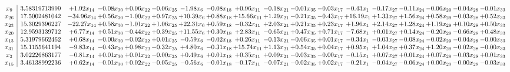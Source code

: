 \documentclass[9pt]{article}
\begin{document}
 \[\begin{array}{c| c c@{\hskip 2pt} c@{\hskip 2pt} c@{\hskip 2pt} c@{\hskip 2pt} c@{\hskip 2pt} c@{\hskip 2pt} c@{\hskip 2pt} c@{\hskip 2pt} c@{\hskip 2pt} c@{\hskip 2pt} c@{\hskip 2pt} c@{\hskip 2pt} c@{\hskip 2pt} c@{\hskip 2pt} c@{\hskip 2pt} c@{\hskip 2pt} }
 x_{9}   &  3.58319713999 & +  1.92 x_{14} & -0.08 x_{30} & +  0.06 x_{22} & -0.06 x_{25} & -1.98 x_{6} & -0.08 x_{18} & +  0.96 x_{11} & -0.18 x_{21} & -0.01 x_{35} & -0.03 x_{17} & -0.43 x_{1} & -0.17 x_{27} & -0.11 x_{24} & -0.06 x_{29} & -0.04 x_{28} & -0.01 x_{33}\\
 x_{26}   &  17.5002481042 & -34.96 x_{14} & +  0.56 x_{30} & -1.00 x_{22} & +  0.97 x_{25} & + 10.39 x_{6} & +  0.88 x_{18} & + 15.66 x_{11} & +  1.29 x_{21} & -0.21 x_{35} & -0.43 x_{17} & + 16.19 x_{1} & +  1.33 x_{27} & +  1.56 x_{24} & +  0.58 x_{29} & -0.03 x_{28} & +  0.52 x_{33}\\
 x_{23}   &  15.3029396227 & -22.27 x_{14} & +  0.58 x_{30} & -1.01 x_{22} & +  1.06 x_{25} & + 22.31 x_{6} & +  0.59 x_{18} & -0.32 x_{11} & +  2.03 x_{21} & +  0.21 x_{35} & +  0.23 x_{17} & +  1.96 x_{1} & +  2.14 x_{27} & +  1.28 x_{24} & +  1.19 x_{29} & +  0.10 x_{28} & +  0.50 x_{33}\\
 x_{20}   &  12.9593139712 & +  6.77 x_{14} & +  0.51 x_{30} & -0.44 x_{22} & +  0.39 x_{25} & + 11.55 x_{6} & +  0.30 x_{18} & +  2.83 x_{11} & -0.65 x_{21} & +  0.47 x_{35} & +  0.71 x_{17} & -7.68 x_{1} & +  0.01 x_{27} & +  0.14 x_{24} & -0.20 x_{29} & -0.66 x_{28} & +  0.48 x_{33}\\
 x_{13}   &  5.31979662462 & +  0.68 x_{14} & -0.00 x_{30} & -0.02 x_{22} & +  0.01 x_{25} & -0.59 x_{6} & -0.02 x_{18} & +  0.26 x_{11} & -0.13 x_{21} & -0.06 x_{35} & +  0.01 x_{17} & -0.34 x_{1} & -0.03 x_{27} & -0.08 x_{24} & -0.02 x_{29} & -0.04 x_{28} & -0.00 x_{33}\\
 x_{31}   &  15.1155641194 & -9.83 x_{14} & -0.43 x_{30} & +  0.98 x_{22} & -0.32 x_{25} & +  4.80 x_{6} & -0.31 x_{18} & + 15.74 x_{11} & +  1.13 x_{21} & +  0.54 x_{35} & +  0.04 x_{17} & +  0.95 x_{1} & +  1.04 x_{27} & +  0.37 x_{24} & +  1.20 x_{29} & -0.02 x_{28} & -0.00 x_{33}\\
 x_{2}   &  3.02226863177 & -0.81 x_{14} & +  0.01 x_{30} & +  0.01 x_{22} & -0.00 x_{25} & +  0.49 x_{6} & +  0.01 x_{18} & +  0.35 x_{11} & +  0.09 x_{21} & -0.03 x_{35} & -0.00 x_{17} & -0.15 x_{1} & +  0.07 x_{27} & +  0.01 x_{24} & +  0.07 x_{29} & -0.03 x_{28} & +  0.01 x_{33}\\
 x_{15}   &  3.46138992236 & +  0.62 x_{14} & -0.01 x_{30} & +  0.02 x_{22} & -0.05 x_{25} & -0.56 x_{6} & -0.01 x_{18} & -0.17 x_{11} & -0.07 x_{21} & -0.02 x_{35} & +  0.02 x_{17} & -0.21 x_{1} & -0.04 x_{27} & -0.06 x_{24} & +  0.00 x_{29} & -0.00 x_{28} & -0.03 x_{33}\\

\end{array}\]
\end{document}
